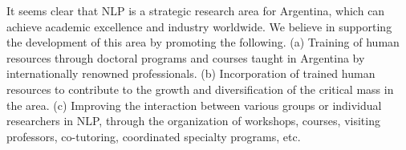 % 
% 
% 

It seems clear that NLP is a strategic research area for Argentina, which can
achieve academic excellence and industry worldwide. We believe in supporting the
development of this area by promoting the following. (a) Training of human
resources through doctoral programs and courses taught in Argentina by
internationally renowned professionals. (b) Incorporation of trained human
resources to contribute to the growth and diversification of the critical mass
in the area. (c) Improving the interaction between various groups or
individual researchers in NLP, through the organization of workshops, courses,
visiting professors, co-tutoring, coordinated specialty programs, etc.

